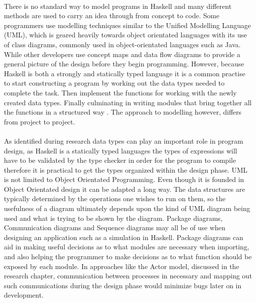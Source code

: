 \documentclass[main.tex]{subfiles}
\begin{document}
\paragraph{}There is no standard way to model programs in Haskell and many different methods are used to carry an idea through from concept to code. Some programmers use modelling techniques similar to the Unified Modelling Language (UML), which is geared heavily towards object orientated languages with its use of class diagrams, commonly used in object-orientated languages such as Java. While other developers use concept maps and data flow diagrams to provide a general picture of the design before they begin programming. However, because Haskell is both a strongly and statically typed language it is a common practise to start constructing a program by working out the data types needed to complete the task. Then implement the functions for working with the newly created data types. Finally culminating in writing modules that bring together all the functions in a structured way \cite{OSullivan2008}. The approach to modelling however, differs from project to project.

\paragraph{} As identified during research data types can play an important role in program design, as Haskell is a statically typed languages the types of expressions will have to be validated by the type checker in order for the program to compile therefore it is practical to get the types organized within the design phase. UML is not limited to Object Orientated Programming. Even though it is founded in Object Orientated design it can be adapted a long way. The data structures are typically determined by the operations one wishes to run on them, so the usefulness of a diagram ultimately depends upon the kind of UML diagram being used and what is trying to be shown by the diagram. Package diagrams, Communication diagrams and Sequence diagrams may all be of use when designing an application such as a simulation in Haskell. Package diagrams can aid in making useful decisions as to what modules are necessary when importing, and also helping the programmer to make decisions as to what function should be exposed by each module. In approaches like the Actor model, discussed in the research chapter, communication between processes in necessary and mapping out such communications during the design phase would minimize bugs later on in development.
\end{document}

